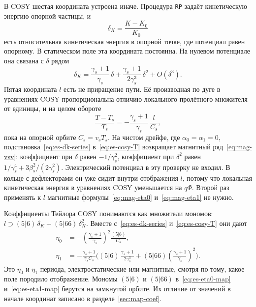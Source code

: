 \documentclass[aps,pra,preprint,a4paper,amsmath,amssymb,longbibliography]{revtex4-2}
\begin{document}
В COSY шестая координата устроена иначе. Процедура \texttt{RP} задаёт кинетическую энергию опорной частицы, и
\begin{equation}
\label{eq:es-deltak}
\delta_K=\frac{K-K_0}{K_0}
\end{equation}
есть относительная кинетическая энергия в опорной точке, где потенциал равен опорному. В статическом поле эта координата постоянна. На нулевом потенциале она связана с $\delta$ рядом
\begin{equation}
\label{eq:es-dk-series}
\delta_K
=\frac{\gamma_s+1}{\gamma_s}\,\delta
+\frac{\gamma_s+1}{2\gamma_s^3}\,\delta^2
+O(\delta^3).
\end{equation}
Пятая координата $l$ есть не приращение пути. Её производная по дуге в уравнениях COSY пропорциональна отличию локального пролётного множителя от единицы, и на целом обороте
\begin{equation}
\label{eq:es-cosy-T}
\frac{T-T_s}{T_s}
=-\frac{\gamma_s+1}{\gamma_s}\,\frac{l}{C_s},
\end{equation}
пока на опорной орбите $C_s=v_s T_s$. На чистом дрейфе, где $\alpha_0=\alpha_1=0$, подстановка~\eqref{eq:es-dk-series} в~\eqref{eq:es-cosy-T} возвращает магнитный ряд~\eqref{eq:mag-vsv}: коэффициент при $\delta$ равен $-1/\gamma_s^2$, коэффициент при $\delta^2$ равен $1/\gamma_s^4+3\beta_s^2/(2\gamma_s^2)$. Электрический потенциал в эту проверку не входил. В кольце с дефлекторами он уже сидит внутри отображения $l$, потому что локальная кинетическая энергия в уравнениях COSY уменьшается на $q\Phi$. Второй раз применять к $l$ магнитные формулы~\eqref{eq:mag-eta0} и~\eqref{eq:mag-eta1} не нужно.

Коэффициенты Тейлора COSY понимаются как множители мономов: $l\supset(5|6)\,\delta_K+(5|66)\,\delta_K^2$. Вместе с~\eqref{eq:es-dk-series} и~\eqref{eq:es-cosy-T} они дают
\begin{align}
\eta_0
&=
-\left(\frac{\gamma_s+1}{\gamma_s}\right)^2\frac{(5|6)}{C_s},
\label{eq:es-eta0-map}\\
\eta_1
&=
-\frac{\gamma_s+1}{\gamma_s C_s}
\Biggl(
(5|6)\,\frac{\gamma_s+1}{2\gamma_s^3}
+(5|66)\left(\frac{\gamma_s+1}{\gamma_s}\right)^2
\Biggr).
\label{eq:es-eta1-map}
\end{align}
Это $\eta_0$ и $\eta_1$ периода, электростатические или магнитные, смотря по тому, какое поле породило отображение. Мономы $(5|6)$ и $(5|66)$ в~\eqref{eq:es-eta0-map} и~\eqref{eq:es-eta1-map} берутся на замкнутой орбите. Их отличие от значений в начале координат записано в разделе~\ref{sec:map-coef}.
\end{document}
